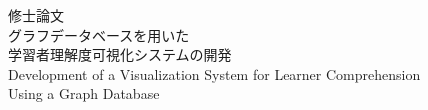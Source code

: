 

\begin{titlepage}
    \begin{center}
    \vspace*{3cm}
    \large
    {\Huge 修\hspace{2zw}士\hspace{2zw}論\hspace{2zw}文}\\
    \vspace*{3cm}
    {\LARGE グラフデータベースを用いた\\学習者理解度可視化システムの開発}
    \\
    \vspace*{1cm}
    {\large Development of a Visualization System for Learner Comprehension \\ Using a Graph Database}
    \end{center}
\end{titlepage}